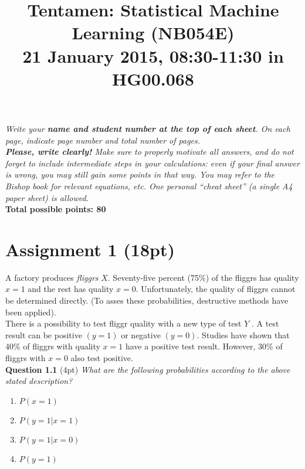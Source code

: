 \documentclass[a4paper]{article}
\begin{document}
\title{Tentamen: Statistical Machine Learning (NB054E)\\ \vspace{1em}21 January 2015, 08:30-11:30 in HG00.068}
\date{}
\maketitle

\vspace{-5em}
\textit{Write your \textbf{name and student number at the top of each sheet}. On each page, indicate page number and total number of pages.\\
\textbf{Please, write clearly!} Make sure to properly motivate all answers, and do not
forget to include intermediate steps in your calculations: even if your final answer is
wrong, you may still gain some points in that way. You may refer to the Bishop book
for relevant equations, etc. One personal “cheat sheet” (a single A4 paper sheet) is
allowed.}\\

\textbf{Total possible points: 80}




\section*{Assignment 1 (18pt)}

A factory produces \textit{fliggrs} $X$. Seventy-five percent (75\%) of the fliggrs has quality $x = 1$ and the rest has quality $x = 0$. Unfortunately, the quality of fliggrs cannot be determined directly. (To
asses these probabilities, destructive methods have been applied).\\
There is a possibility to test fliggr quality with a new type of test $Y$ . A test result can be positive $(y = 1)$ or negative $(y = 0)$. Studies have shown that 40\% of fliggrs with quality $x = 1$ have a positive test result. However, 30\% of fliggrs with $x = 0$ also test positive.\\

\textbf{Question 1.1} (4pt) \textit{What are the following probabilities according to the above stated description?}

\begin{multicols}{2}
\begin{enumerate}[i]
    \item $P(x = 1)$
    \item $P(y = 1 | x = 1)$
    \item $P(y = 1 | x = 0)$
    \item $P(y = 1)$
\end{enumerate}
\end{multicols}
\end{document}

